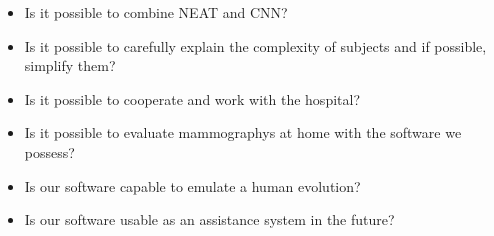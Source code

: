 \begin{itemize}
	\item{Is it possible to combine NEAT and CNN?}
	\item{Is it possible to carefully explain the complexity of subjects and if possible, simplify them?}
	\item{Is it possible to cooperate and work with the hospital?}
	\item{Is it possible to evaluate mammographys at home with the software we possess?}
	\item{Is our software capable to emulate a human evolution?}
	\item{Is our software usable as an assistance system in the future?}
\end{itemize}
